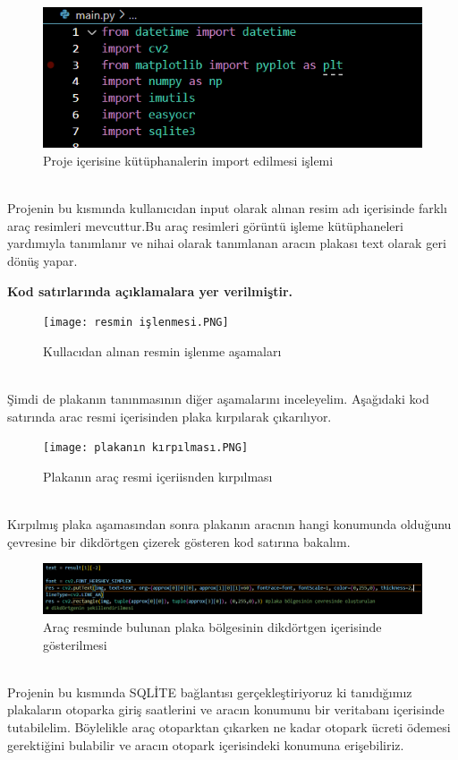 \begin{figure}
    \centering
    \includegraphics{fig/importlama.PNG}
    \caption{Proje içerisine kütüphanalerin import edilmesi işlemi}
    \label{fig:my_label}
\end{figure} \\

Projenin bu kısmında kullanıcıdan input olarak alınan resim adı içerisinde farklı araç resimleri mevcuttur.Bu araç resimleri görüntü işleme kütüphaneleri yardımıyla tanımlanır ve nihai olarak tanımlanan aracın plakası text olarak geri dönüş yapar.

\textbf{Kod satırlarında açıklamalara yer verilmiştir.}

 \begin{figure}
    \centering
    \texttt{[image: resmin işlenmesi.PNG]}
    \caption{Kullacıdan alınan resmin işlenme aşamaları}
    \label{fig:my_label}
\end{figure} \\

Şimdi de plakanın tanınmasının diğer aşamalarını inceleyelim. Aşağıdaki kod satırında arac resmi içerisinden plaka kırpılarak çıkarılıyor.
 \begin{figure}
    \centering
    \texttt{[image: plakanın kırpılması.PNG]}
    \caption{Plakanın araç resmi içeriisnden kırpılması}
    \label{fig:my_label}
\end{figure} \\

Kırpılmış plaka aşamasından sonra plakanın aracnın hangi konumunda olduğunu çevresine bir dikdörtgen çizerek gösteren kod satırına bakalım.
 \begin{figure}
    \centering
    \includegraphics{plakanın çevresine dikdörtgen inşası.PNG}
    \caption{Araç resminde bulunan plaka bölgesinin dikdörtgen içerisinde gösterilmesi}
    \label{fig:my_label}
\end{figure} \\
\cite{pythonsqlbaglantisi}
Projenin bu kısmında SQLİTE bağlantısı gerçekleştiriyoruz ki tanıdığımız plakaların otoparka giriş saatlerini ve aracın konumunu bir veritabanı içerisinde tutabilelim. Böylelikle araç otoparktan çıkarken ne kadar otopark ücreti ödemesi gerektiğini bulabilir ve aracın otopark içerisindeki konumuna erişebiliriz.

